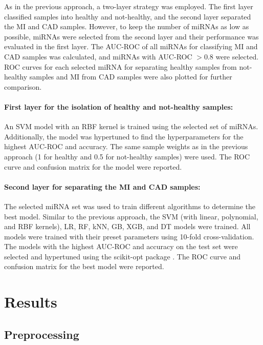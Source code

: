 \documentclass[sn-mathphys,Numbered]{sn-jnl}%
\theoremstyle{thmstyleone}%
\theoremstyle{thmstyletwo}%
\theoremstyle{thmstylethree}%
\begin{document}
As in the previous approach, a two-layer strategy was employed. The
first layer classified samples into healthy and not-healthy, and the
second layer separated the MI and CAD samples. However, to keep the
number of miRNAs as low as possible, miRNAs were selected from the
second layer and their performance was evaluated in the first layer. The
AUC-ROC of all miRNAs for classifying MI and CAD samples was calculated,
and miRNAs with AUC-ROC $> 0.8$ were selected. ROC curves for each
selected miRNA for separating healthy samples from not-healthy samples
and MI from CAD samples were also plotted for further comparison.


\paragraph{First layer for the isolation of healthy and not-healthy
samples:}\label{first-layer-for-the-isolation-of-healthy-and-not-healthy-samples-1}

An SVM model with an RBF kernel is trained using the selected set of
miRNAs. Additionally, the model was hypertuned to find the
hyperparameters for the highest AUC-ROC and accuracy. The same sample
weights as in the previous approach (1 for healthy and 0.5 for
not-healthy samples) were used. The ROC curve and confusion matrix for
the model were reported.


\paragraph{Second layer for separating the MI and CAD
samples:}\label{second-layer-for-separating-the-mi-and-cad-samples-1}

The selected miRNA set was used to train different algorithms to
determine the best model. Similar to the previous approach, the SVM
(with linear, polynomial, and RBF kernels), LR, RF, kNN, GB, XGB, and DT
models were trained. All models were trained with their preset
parameters using 10-fold cross-validation. The models with the highest
AUC-ROC and accuracy on the test set were selected and hypertuned using
the scikit-opt package \cite{scikitopt}. The ROC curve and confusion
matrix for the best model were reported.




\section{Results}\label{results}

\subsection{Preprocessing}\label{preprocessing-1}
\end{document}
